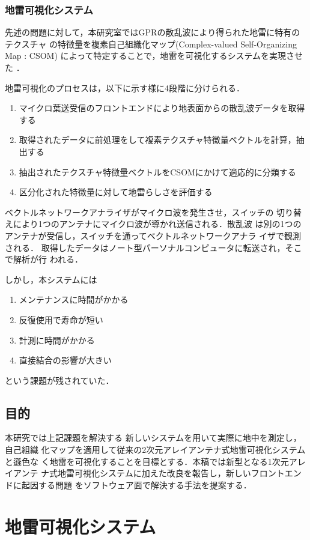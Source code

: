 ﻿\documentclass[12pt,oneside]{jsbook}
\begin{document}
\subsection{地雷可視化システム}
先述の問題に対して，本研究室ではGPRの散乱波により得られた地雷に特有のテクスチャ
の特徴量を複素自己組織化マップ(Complex-valued Self-Organizing Map : CSOM)
によって特定することで，地雷を可視化するシステムを実現させた
\cite{2007SMas}\cite{2008SMas}\cite{2009Nakano}\cite{2010Nakano}．

地雷可視化のプロセスは，以下に示す様に4段階に分けられる．
\begin{enumerate}
 \item マイクロ葉送受信のフロントエンドにより地表面からの散乱波データを取得する
 \item 取得されたデータに前処理をして複素テクスチャ特徴量ベクトルを計算，抽出する
 \item 抽出されたテクスチャ特徴量ベクトルをCSOMにかけて適応的に分類する
 \item 区分化された特徴量に対して地雷らしさを評価する
\end{enumerate}
ベクトルネットワークアナライザがマイクロ波を発生させ，スイッチの
切り替えにより1つのアンテナにマイクロ波が導かれ送信される．散乱波
は別の1つのアンテナが受信し，スイッチを通ってベクトルネットワークアナラ
イザで観測される．
取得したデータはノート型パーソナルコンピュータに転送され，そこで解析が行
われる．

しかし，本システムには
\begin{enumerate}
 \item メンテナンスに時間がかかる
 \item 反復使用で寿命が短い
 \item 計測に時間がかかる
 \item 直接結合の影響が大きい
\end{enumerate}
という課題が残されていた．

\section{目的}
本研究では上記課題を解決する
新しいシステムを用いて実際に地中を測定し，自己組織
化マップを適用して従来の2次元アレイアンテナ式地雷可視化システムと遜色な
く地雷を可視化することを目標とする．本稿では新型となる1次元アレイアンテ
ナ式地雷可視化システムに加えた改良を報告し，新しいフロントエンドに起因する問題
をソフトウェア面で解決する手法を提案する．
\newpage
\chapter{地雷可視化システム}
\end{document}
